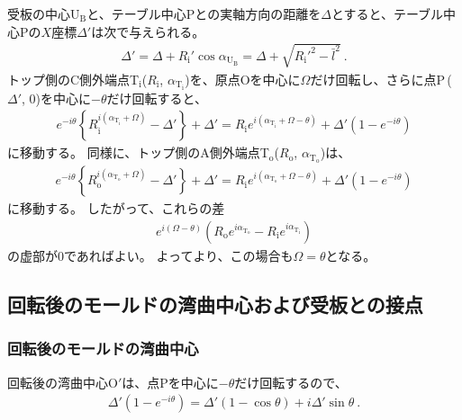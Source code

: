 受板の中心U$_\mathrm B$と、テーブル中心Pとの実軸方向の距離を$\varDelta$とすると、テーブル中心Pの$X$座標$\varDelta'$は次で与えられる。
\begin{align}
  \label{eq:tableCenter}
  \varDelta'
  = \varDelta+R_\mathrm i'\cos\alpha_{\mathrm U_\mathrm B} = \varDelta+\sqrt{R_\mathrm i'^2-\bar l^2}\ .
\end{align}
トップ側のC側外端点T$_\mathrm i$($R_\mathrm i$, $\alpha_{\mathrm T_\mathrm i}$)を、原点Oを中心に$\Omega$だけ回転し、さらに点P\,($\varDelta'$, $0$)を中心に$-\theta$だけ回転すると、
\begin{align}
  \label{eq:afterfttable}
  e^{-i\theta}\left\{R_\mathrm i^{i(\alpha_{\mathrm T_\mathrm i}+\Omega)}-\varDelta'\right\}+\varDelta'
  = R_\mathrm ie^{i(\alpha_{\mathrm T_\mathrm i}+\Omega-\theta)}+\varDelta'\left(1-e^{-i\theta}\right)
\end{align}
に移動する。
同様に、トップ側のA側外端点T$_\mathrm o$($R_\mathrm o$, $\alpha_{\mathrm T_\mathrm o}$)は、
\begin{align*}
  e^{-i\theta}\!\left\{R_\mathrm o^{i(\alpha_{\mathrm T_\mathrm o}+\Omega)}-\varDelta'\right\}+\varDelta'
  = R_\mathrm ie^{i(\alpha_{\mathrm T_\mathrm o}+\Omega-\theta)}+\varDelta'\!\left(1-e^{-i\theta}\right)
\end{align*}
に移動する。
したがって、これらの差
\begin{align*}
  e^{i(\Omega-\theta)}
  \left(R_\mathrm oe^{i\alpha_{\mathrm T_\mathrm o}}-R_\mathrm ie^{i\alpha_{\mathrm T_\mathrm i}}\right)
\end{align*}
の虚部が$0$であればよい。
よってより、この場合も$\Omega = \theta$となる。


\subsection{回転後のモールドの湾曲中心および受板との接点}

\subsubsection{回転後のモールドの湾曲中心}
回転後の湾曲中心O$'$は、点Pを中心に$-\theta$だけ回転するので、
\begin{align*}
  \varDelta'\!\left(1-e^{-i\theta}\right) = \varDelta'(1-\cos\theta)+i\varDelta'\sin\theta\ .
\end{align*}

